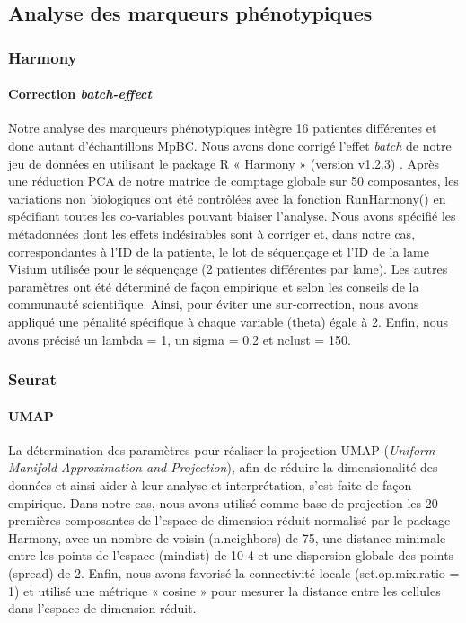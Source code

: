 \documentclass[11pt]{article}
\begin{document}
\subsection{Analyse des marqueurs phénotypiques}

\subsubsection{Harmony}

\paragraph{Correction \textit{batch-effect}}

Notre analyse des marqueurs phénotypiques intègre 16 patientes différentes et donc autant d’échantillons MpBC. Nous avons donc corrigé l’effet \textit{batch} de notre jeu de données en utilisant le package R « Harmony » (version v1.2.3) \cite{Korsunsky2019}. Après une réduction PCA de notre matrice de comptage globale sur 50 composantes, les variations non biologiques ont été contrôlées avec la fonction RunHarmony() en spécifiant toutes les co-variables pouvant biaiser l’analyse. Nous avons spécifié les métadonnées dont les effets indésirables sont à corriger et, dans notre cas, correspondantes à l’ID de la patiente, le lot de séquençage et l’ID de la lame Visium utilisée pour le séquençage (2 patientes différentes par lame). Les autres paramètres ont été déterminé de façon empirique et selon les conseils de la communauté scientifique. Ainsi, pour éviter une sur-correction, nous avons appliqué une pénalité spécifique à chaque variable (theta) égale à 2. Enfin, nous avons précisé un lambda = 1, un sigma = 0.2 et nclust = 150.

\subsubsection{Seurat}

\paragraph{UMAP}

La détermination des paramètres pour réaliser la projection UMAP (\textit{Uniform Manifold Approximation and Projection}), afin de réduire la dimensionalité des données et ainsi aider à leur analyse et interprétation, s’est faite de façon empirique. Dans notre cas, nous avons utilisé comme base de projection les 20 premières composantes de l’espace de dimension réduit normalisé par le package Harmony, avec un nombre de voisin (n.neighbors) de 75, une distance minimale entre les points de l’espace (mindist) de 10-4 et une dispersion globale des points (spread) de 2. Enfin, nous avons favorisé la connectivité locale (set.op.mix.ratio = 1) et utilisé une métrique « cosine » pour mesurer la distance entre les cellules dans l’espace de dimension réduit.
\end{document}
